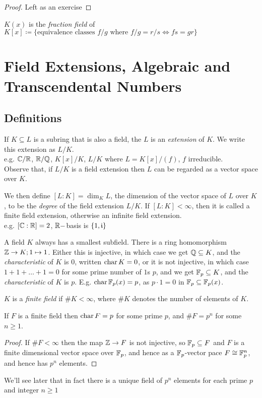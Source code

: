 \documentclass[10pt,a4paper]{article}
\begin{document}
\begin{proof}
Left as an exercise
\end{proof}

$K(x)$ is the \emph{fraction field} of $K[x] \coloneqq \{\text{equivalence classes } f/g \text{ where } f/g=r/s \iff fs=gr\}$

\section{Field Extensions, Algebraic and Transcendental Numbers}
\subsection{Definitions}
If $K \subseteq L$ is a subring that is also a field, the $L$ is an \emph{extension} of $K$. We write this extension as $L/K$.\\
e.g. $\mathbb{C}/\mathbb{R}$, $\mathbb{R}/\mathbb{Q}$, $K[x]/K$, $L/K$ where $L = K[x]/(f)$, $f$ irreducible.\\
Observe that, if $L/K$ is a field extension then $L$ can be regarded as a vector space over $K$.

We then define $[L:K] = \dim_K L$, the dimension of the vector space of $L$ over $K$, to be the \emph{degree} of the field extension $L/K$. If $[L:K] < \infty$, then it is called a finite field extension, otherwise an infinite field extension.\\
e.g. $[\mathbb{C}:\mathbb{R}] = 2$, $\mathbb{R}-$basis is $\{1, \mathfrak{i}\}$

A field $K$ always has a smallest subfield. There is a ring homomorphism $\mathbb{Z} \rightarrow K; 1 \mapsto 1$. Either this is injective, in which case we get $\mathbb{Q} \subseteq K$, and the \emph{characteristic} of $K$ is $0$, written $\operatorname{char} K = 0$, or it is not injective, in which case $1+1+\ldots+1 = 0$ for some prime number of $1$s $p$, and we get $\mathbb{F}_p \subseteq K$, and the \emph{characteristic} of $K$ is $p$. E.g. $\operatorname{char} \mathbb{F}_p(x) = p$, as $p\cdot 1 = 0$ in $\mathbb{F}_p \subseteq \mathbb{F}_p(x)$.

$K$ is a \emph{finite field} if $\#K < \infty$, where $\#K$ denotes the number of elements of $K$.

\begin{lemma}
If $F$ is a finite field then $\operatorname{char} F = p$ for some prime $p$, and $\#F = p^n$ for some $n \geq 1$.
\end{lemma}
\begin{proof}
If $\#F < \infty$ then the map $\mathbb{Z} \rightarrow F$ is not injective, so $\mathbb{F}_p \subseteq F$ and $F$ is a finite dimensional vector space over $\mathbb{F}_p$, and hence as a $\mathbb{F}_p$-vector pace $F\cong \mathbb{F}_p^n$, and hence has $p^n$ elements.
\end{proof}
We'll see later that in fact there is a unique field of $p^n$ elements for each prime $p$ and integer $n\geq 1$
\end{document}
